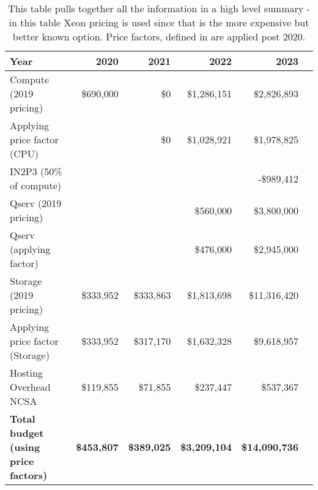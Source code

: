 \tiny \begin{longtable} { |p{}  |r  |r  |r  |r  |r |} 
\caption{This table pulls together all the information in a high level summary - in this table Xeon pricing is used since that is the more expensive but better known option. Price factors, defined in  are applied post 2020.
 \label{tab:Summary}}\\ 
\hline 
\textbf{Year}&\textbf{2020}&\textbf{2021}&\textbf{2022}&\textbf{2023} \\ \hline
{Compute (2019 pricing)}&{\$690,000}&{\$0}&{\$1,286,151}&{\$2,826,893} \\ \hline
{Applying price factor (CPU)}&{}&{\$0}&{\$1,028,921}&{\$1,978,825} \\ \hline
{IN2P3 (50\% of compute)}&{}&{}&{}&{-\$989,412} \\ \hline
{Qserv (2019 pricing)}&{}&{}&{\$560,000}&{\$3,800,000} \\ \hline
{Qserv (applying factor)}&{}&{}&{\$476,000}&{\$2,945,000} \\ \hline
{Storage (2019 pricing)}&{\$333,952}&{\$333,863}&{\$1,813,698}&{\$11,316,420} \\ \hline
{Applying price factor (Storage)}&{\$333,952}&{\$317,170}&{\$1,632,328}&{\$9,618,957} \\ \hline
{Hosting Overhead NCSA
}&{\$119,855}&{\$71,855}&{\$237,447}&{\$537,367} \\ \hline
\textbf{Total budget (using price factors)}&\textbf{\$453,807}&\textbf{\$389,025}&\textbf{\$3,209,104}&\textbf{\$14,090,736} \\ \hline
\end{longtable} \normalsize
